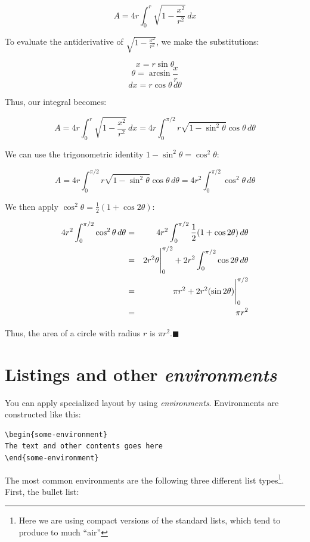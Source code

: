 $$
A = 4r\int_0^r \sqrt {1-\frac{x^2}{r^2}}\, dx
$$

To evaluate the antiderivative of $\displaystyle\sqrt
{1-\frac{x^2}{r^2}}$, we make the substitutions:

$$
x = r \sin \theta
$$
$$
\theta = \arcsin \frac{x}{r}
$$
$$
dx = r\cos \theta\, d\theta
$$

Thus, our integral becomes:

$$
A=4r\int_0^r \sqrt {1-\frac{x^2}{r^2}}\, dx = 4r\int_0^{\pi/2}
r\sqrt{1-\sin^2 \theta} \cos \theta\, d\theta
$$

 We can use the trigonometric identity $1 - \sin^2 \theta = \cos^2 \theta$:

$$
A=4r\int_0^{\pi/2} r\sqrt{1-\sin^2 \theta} \cos \theta\, d\theta=
4r^2\int_0^{\pi/2} \cos^2 \theta\, d\theta
$$

We then apply $\cos^2 \theta = \frac{1}{2}(1 + \cos 2\theta)$:

\begin{eqnarray*}
4r^2\int_0^{\pi/2} \cos^2 \theta\, d\theta &=& 4r^2\int_0^{\pi/2}  \frac{1}{2}(1 + \cos 2\theta) \,d\theta\\
& = & {2r^2\theta}\Bigg{|}_0^{\pi/2} + 2r^2\int_0^{\pi/2} \cos 2\theta \,d\theta\\
                                  & = & \pi r^2 + 2r^2(\sin2\theta)\Bigg{|}_0^{\pi/2}\\
                                  & = & \pi r^2
\end{eqnarray*}

Thus, the area of a circle with radius $r$ is $\pi r^2$.\hfill$\blacksquare$

\section{Listings and other {\em environments}}

You can apply specialized layout by using  {\em environments}. Environments are constructed like this:

\begin{lstlisting}[float=htpb]
\begin{some-environment}
The text and other contents goes here
\end{some-environment}
\end{lstlisting}

The most common environments are the following three different list types\footnote{Here we are using compact versions of the standard lists, which tend to produce to much ``air''}. First, the bullet list:

